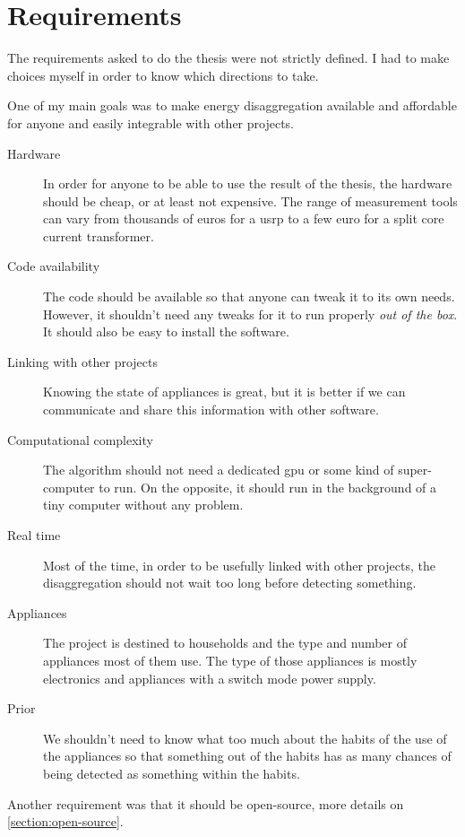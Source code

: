 \chapter{Requirements}\label{section:requirements}
The requirements asked to do the thesis were not strictly defined. I had to make choices myself in order to know which directions to take.

One of my main goals was to make energy disaggregation available and affordable for anyone and easily integrable with other projects.

\begin{description}
\item[Hardware] In order for anyone to be able to use the result of the thesis, the hardware should be cheap, or at least not expensive. The range of measurement tools can vary from thousands of euros for a \acrfull{usrp} to a few euro for a split core current transformer.
\item[Code availability] The code should be available so that anyone can tweak it to its own needs. However, it shouldn't need any tweaks for it to run properly \textit{out of the box}. It should also be easy to install the software.
\item[Linking with other projects] Knowing the state of appliances is great, but it is better if we can communicate and share this information with other software.
\item[Computational complexity] The algorithm should not need a dedicated \acrshort{gpu} or some kind of super-computer to run. On the opposite, it should run in the background of a tiny computer without any problem. 
\item[Real time] Most of the time, in order to be usefully linked with other projects, the disaggregation should not wait too long before detecting something.
\item[Appliances] The project is destined to households and the type and number of appliances most of them use. The type of those appliances is mostly electronics and appliances with a switch mode power supply.
\item[Prior] We shouldn't need to know what too much about the habits of the use of the appliances so that something out of the habits has as many chances of being detected as something within the habits.
\end{description}

Another requirement was that it should be open-source, more details on \autoref{section:open-source}.